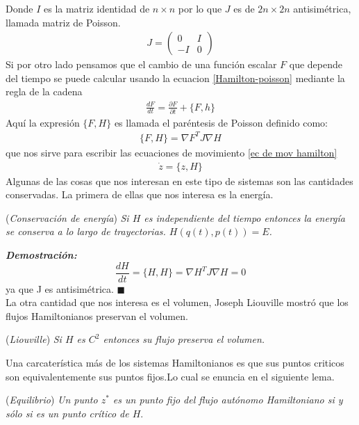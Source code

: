 Donde $I$ es la matriz identidad de $n\times n$ por lo que $J$ es de $2n\times 2n$ antisimétrica, llamada matriz de Poisson. 
\begin{eqnarray*}
J=  \begin{pmatrix}
0 & I\\
-I & 0
\end{pmatrix}
\end{eqnarray*}
Si por otro lado pensamos que el cambio de una función escalar $F$ que depende del tiempo se puede calcular usando la ecuacion \ref{Hamilton-poisson} mediante la regla de la cadena 
\begin{eqnarray*}
\frac{dF}{dt}=\frac{\partial F}{\partial t}+ \lbrace F,h\rbrace
\end{eqnarray*}
Aquí la expresión $\lbrace F,H \rbrace$ es llamada el paréntesis de Poisson definido como:
\begin{eqnarray}
\lbrace F,H \rbrace=\nabla F^{T}J\nabla H \label{Parentesis Poisson}
\end{eqnarray}
que nos sirve para escribir las ecuaciones de movimiento \ref{ec de mov hamilton}
\begin{eqnarray}
\dot{z}=\lbrace z,H\rbrace \label{ec. de movimiento 2}
\end{eqnarray}
Algunas de las cosas que nos interesan en este tipo de sistemas son las cantidades conservadas. La primera de ellas que nos interesa es la energía.\\

\begin{lem}(\emph{\textit{Conservación de energía}})
\textit{Si $H$ es independiente del tiempo entonces la energía se conserva a lo largo de trayectorias. $H(q(t),p(t))=E$.}
\end{lem}
\textit{\textbf{Demostración:}}
\begin{equation*}
\frac{dH}{dt}=\lbrace H, H \rbrace = \nabla H^{T} J \nabla H=0  
\end{equation*}
ya que J es antisimétrica. $\blacksquare$ \\

La otra cantidad que nos interesa es el volumen, Joseph Liouville mostró que los flujos Hamiltonianos preservan el volumen.

\begin{lem}(\emph{\textit{Liouville}})
\textit{Si $H$ es $C^{2}$ entonces su flujo preserva el volumen.}
\end{lem}

Una carcaterística más de los sistemas Hamiltonianos es que sus puntos criticos son equivalentemente sus puntos fijos.Lo cual se enuncia en el siguiente lema. 
\begin{lem}(\emph{Equilibrio})
\textit{Un punto $z^{*}$ es un punto fijo del flujo autónomo Hamiltoniano si y sólo si es un punto crítico de $H$}.
\end{lem}

